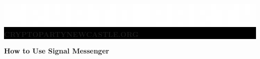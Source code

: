 \documentclass[10.5pt,a4paper]{article} %
\begin{document}

\begin{center}
	\vspace{1cm}
	\colorbox{Black}{
		\begin{minipage}{18.5cm}
			\begin{center}
			\color{white}
			\vspace{0.3cm}
	             \includegraphics[width=1\textwidth]{organisationlogo.eps} %
	        \\[10pt]
			     \textbf{{\LARGE CRYPTOPARTYNEWCASTLE.ORG}} %
			\vspace{0.3cm}
			\end{center}
		\end{minipage}
	}
\end{center}


\begin{center}
\vspace{0.5cm}
\textbf{{\LARGE How to Use Signal Messenger} %
\vspace{0.5cm}
}\end{center}
\end{document}
